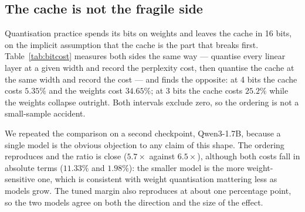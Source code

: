 \documentclass[5p]{elsarticle}
\begin{document}
\subsection{The cache is not the fragile side}
\label{sec:results-bitcost}

Quantisation practice spends its bits on weights and leaves the cache in 16
bits, on the implicit assumption that the cache is the part that breaks first.
Table~\ref{tab:bitcost} measures both sides the same way --- quantise every
linear layer at a given width and record the perplexity cost, then quantise the
cache at the same width and record the cost --- and finds the opposite: at 4 bits
the cache costs $5.35\%$ and the weights cost $34.65\%$; at 3 bits the cache costs
$25.2\%$ while the weights collapse outright. Both intervals exclude zero, so the
ordering is not a small-sample accident.

We repeated the comparison on a second checkpoint, Qwen3-1.7B, because a single
model is the obvious objection to any claim of this shape. The ordering
reproduces and the ratio is close ($5.7\times$ against $6.5\times$), although
both costs fall in absolute terms ($11.33\%$ and $1.98\%$): the smaller model is
the more weight-sensitive one, which is consistent with weight quantisation
mattering less as models grow. The tuned margin also reproduces at about one
percentage point, so the two models agree on both the direction and the size of
the effect.
\end{document}
